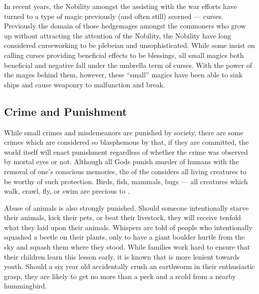 \documentclass[blue]{GL2020}
\begin{document}
In recent years, the Nobility amongst the \pFarm{} assisting with the war efforts have turned to a type of magic previously (and often still) scorned — curses.  Previously the domain of those hedgemages amongst the commoners who grow up without attracting the attention of the Nobility, the Nobility have long considered curseworking to be plebeian and unsophisticated. While some insist on calling curses providing beneficial effects to be blessings, all small magics both beneficial and negative fall under the umbrella term of curses. With the power of the \pFarm{} mages behind them, however, these ``small'' magics have been able to sink ships and cause \pShip{} weaponry to malfunction and break.

\subsection*{Crime and Punishment}
While small crimes and misdemeanors are punished by society, there are some crimes which are considered so blasphemous by \cFarmGod{} that, if they are committed, the world itself will enact punishment regardless of whether the crime was observed by mortal eyes or not. Although all Gods punish murder of humans with the removal of one's conscious memories, the \cFarmGod{\God} of the \pFarm{} considers all living creatures to be worthy of such protection.  Birds, fish, mammals, bugs — all creatures which walk, crawl, fly, or swim are precious to \cFarmGod{}.

Abuse of animals is also strongly punished. Should someone intentionally starve their animals, kick their pets, or beat their livestock, they will receive tenfold what they laid upon their animals.  Whispers are told of people who intentionally squashed a beetle on their plants, only to have a giant boulder hurtle from the sky and squash them where they stood. While families work hard to ensure that their children learn this lesson early, it is known that \cFarmGod{} is more lenient towards youth. Should a six year old accidentally crush an earthworm in their enthusiastic grasp, they are likely to get no more than a peck and a scold from a nearby hummingbird.
\end{document}

